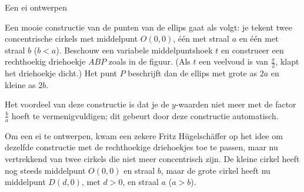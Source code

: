 \begin{lesactiviteit}{Een ei ontwerpen}
\begin{vraagenantwoord}[resume]
\end{vraagenantwoord}

Een mooie constructie van de punten van de ellips gaat als volgt: je tekent twee concentrische cirkels met middelpunt $O(0, 0)$, één met straal $a$ en één met straal $b$ ($b<a$). Beschouw een variabele middelpuntshoek $t$ en construeer een rechthoekig driehoekje $ABP$ zoals in de figuur. (Als $t$ een veelvoud is van $\frac{\pi}{2}$, klapt het driehoekje dicht.) Het punt $P$ beschrijft dan de ellips met grote as $2a$ en kleine as $2b$.
 

\begin{vraagenantwoord} [resume]
    
\end{vraagenantwoord}

Het voordeel van deze constructie is dat je de $y$-waarden niet meer met de factor $\frac{b}{a}$ hoeft te vermenigvuldigen; dit gebeurt door deze constructie automatisch.
    
Om een ei te ontwerpen, kwam een zekere Fritz Hügelschäffer op het idee om dezelfde constructie met de rechthoekige driehoekjes toe te passen, maar nu vertrekkend van twee cirkels die niet meer concentrisch zijn. De kleine cirkel heeft nog steeds middelpunt $O(0, 0)$ en straal $b$, maar de grote cirkel heeft nu middelpunt $D(d, 0)$, met $d>0$, en straal $a$ ($a>b$).

\begin{vraagenantwoord} [resume]
    
        
    

\end{vraagenantwoord}
\end{lesactiviteit}
